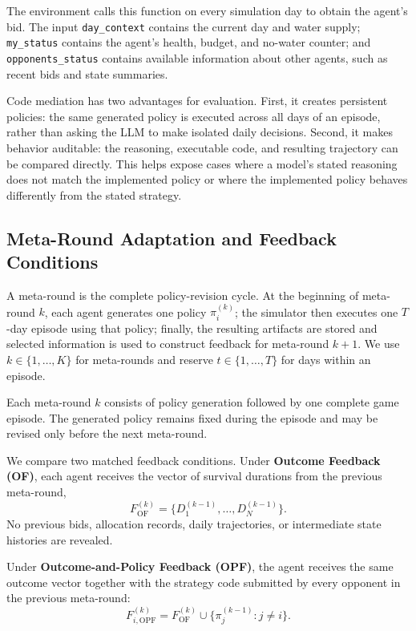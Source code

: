 \documentclass[letterpaper]{article} %
\begin{document}
The environment calls this function on every simulation day to obtain the agent's bid. The input \texttt{day\_context} contains the current day and water supply; \texttt{my\_status} contains the agent's health, budget, and no-water counter; and \texttt{opponents\_status} contains available information about other agents, such as recent bids and state summaries.

Code mediation has two advantages for evaluation. First, it creates persistent policies: the same generated policy is executed across all days of an episode, rather than asking the LLM to make isolated daily decisions. Second, it makes behavior auditable: the reasoning, executable code, and resulting trajectory can be compared directly. This helps expose cases where a model's stated reasoning does not match the implemented policy or where the implemented policy behaves differently from the stated strategy.

\subsection{Meta-Round Adaptation and Feedback Conditions}
A meta-round is the complete policy-revision cycle. At the
beginning of meta-round $k$, each agent generates one policy
$\pi_i^{(k)}$; the simulator then executes one $T$-day episode
using that policy; finally, the resulting artifacts are stored
and selected information is used to construct feedback for
meta-round $k+1$. We use $k\in\{1,\ldots,K\}$ for meta-rounds
and reserve $t\in\{1,\ldots,T\}$ for days within an episode.

Each meta-round $k$ consists of policy generation followed by
one complete game episode. The generated policy remains fixed
during the episode and may be revised only before the next
meta-round.

We compare two matched feedback conditions. Under
\textbf{Outcome Feedback (OF)}, each agent receives the vector
of survival durations from the previous meta-round,
\begin{equation}
    F_{\mathrm{OF}}^{(k)}
    =
    \{D_1^{(k-1)},\ldots,D_N^{(k-1)}\}.
\end{equation}
No previous bids, allocation records, daily trajectories, or
intermediate state histories are revealed.

Under \textbf{Outcome-and-Policy Feedback (OPF)}, the agent
receives the same outcome vector together with the strategy
code submitted by every opponent in the previous meta-round:
\begin{equation}
    F_{i,\mathrm{OPF}}^{(k)}
    =
    F_{\mathrm{OF}}^{(k)}
    \cup
    \{\pi_j^{(k-1)}:j\neq i\}.
\end{equation}
\end{document}
